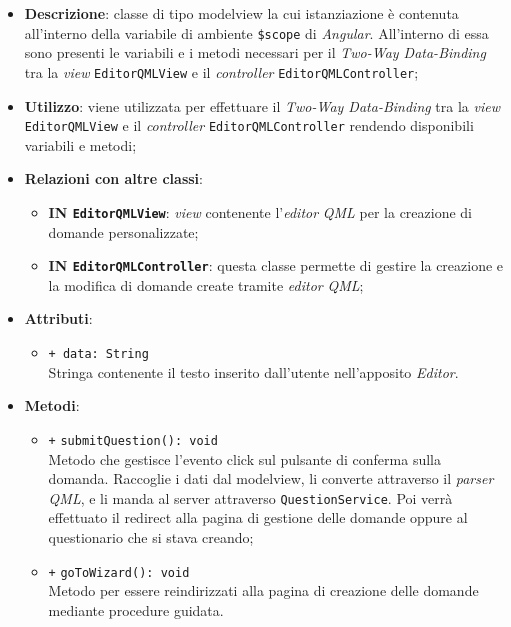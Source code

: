 \begin{itemize}
	\item \textbf{Descrizione}: classe di tipo modelview la cui istanziazione è contenuta all'interno della variabile di ambiente \texttt{\$scope} di \textit{Angular}. All'interno di essa sono presenti le variabili e i metodi necessari per il \textit{Two-Way Data-Binding} tra la \textit{view} \texttt{EditorQMLView} e il \textit{controller} \texttt{EditorQMLController}; 
	\item \textbf{Utilizzo}: viene utilizzata per effettuare il \textit{Two-Way Data-Binding} tra la \textit{view}\\ \texttt{EditorQMLView} e il \textit{controller} \texttt{EditorQMLController} rendendo disponibili variabili e metodi;
	\item \textbf{Relazioni con altre classi}:
	\begin{itemize}
		\item \textbf{IN \texttt{EditorQMLView}}: \textit{view} contenente l'\textit{editor} \textit{QML} per la creazione di domande personalizzate; 
		\item \textbf{IN \texttt{EditorQMLController}}: questa classe permette di gestire la creazione e la modifica di domande create tramite \textit{editor} \textit{QML};
	\end{itemize}
	\item \textbf{Attributi}:
	\begin{itemize}
		\item \texttt{+ data: String} \\ Stringa contenente il testo inserito dall'utente nell'apposito \textit{Editor}.
	\end{itemize}
	\item \textbf{Metodi}:
	\begin{itemize}
		\item \texttt{+} \texttt{submitQuestion(): void}\\ 
		Metodo che gestisce l’evento click sul pulsante di conferma sulla domanda. Raccoglie i dati dal modelview, li converte attraverso il \textit{parser} \textit{QML}, e li manda al server attraverso \texttt{QuestionService}. Poi verrà effettuato il redirect alla pagina di gestione delle domande oppure al questionario che si stava creando;
		\item \texttt{+} \texttt{goToWizard(): void}\\ 
		Metodo per essere reindirizzati alla pagina di creazione delle domande mediante procedure guidata.
	\end{itemize}
\end{itemize}
